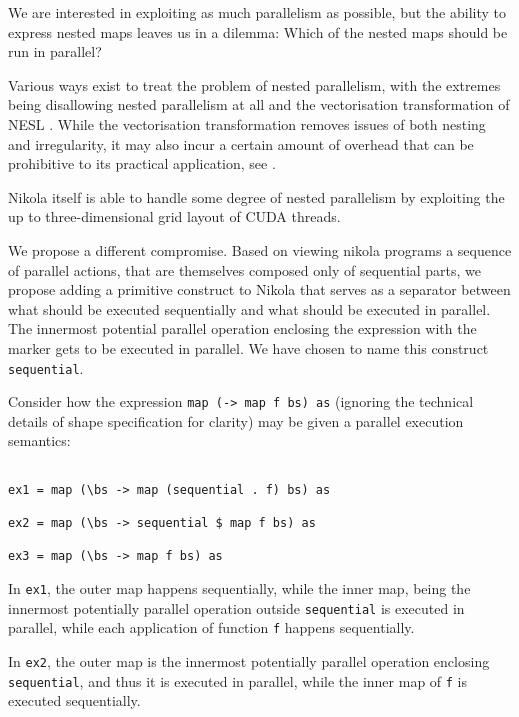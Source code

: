 \label{chap:directing-parallelism}

We are interested in exploiting as much parallelism as possible, but the
ability to express nested maps leaves us in a dilemma: Which of the nested maps
should be run in parallel?

Various ways exist to treat the problem of nested parallelism, with the
extremes being disallowing nested parallelism at all and the vectorisation
transformation of NESL \cite{nesl}. While the vectorisation transformation
removes issues of both nesting and irregularity, it may also incur a certain
amount of overhead that can be prohibitive to its practical application, see
\cite{Catanzaro2011}.

Nikola itself is able to handle some degree of nested parallelism by exploiting
the up to three-dimensional grid layout of CUDA threads.

We propose a different compromise. Based on viewing nikola programs a sequence
of parallel actions, that are themselves composed only of sequential parts, we
propose adding a primitive construct to Nikola that serves as a separator
between what should be executed sequentially and what should be executed in
parallel. The innermost potential parallel operation enclosing the expression
with the marker gets to be executed in parallel. We have chosen to name this
construct \texttt{sequential}.

Consider how the expression \texttt{map (\bs -> map f bs) as} (ignoring the
technical details of shape specification for clarity) may be given a parallel
execution semantics:

\begin{verbatim}

ex1 = map (\bs -> map (sequential . f) bs) as

ex2 = map (\bs -> sequential $ map f bs) as

ex3 = map (\bs -> map f bs) as

\end{verbatim}

In \texttt{ex1}, the outer map happens sequentially, while the inner map, being
the innermost potentially parallel operation outside \texttt{sequential} is
executed in parallel, while each application of function \texttt{f} happens
sequentially.

In \texttt{ex2}, the outer map is the innermost potentially parallel operation
enclosing \texttt{sequential}, and thus it is executed in parallel, while the
inner map of \texttt{f} is executed sequentially.

